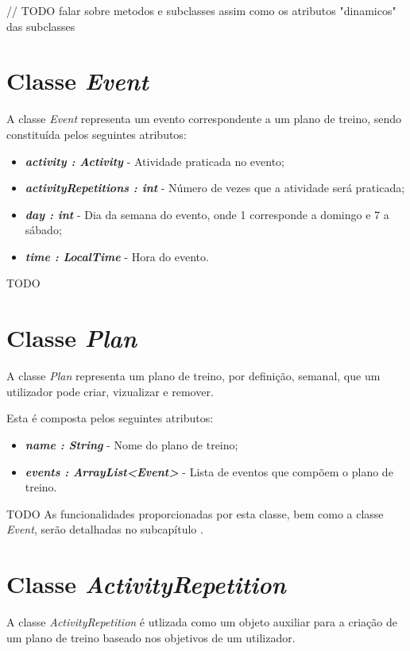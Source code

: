\documentclass[a4paper,12pt]{scrreprt}
\begin{document}
    // TODO falar sobre metodos e subclasses assim como os atributos "dinamicos" das subclasses

\section{Classe \textit{Event}}
    A classe \textit{Event} representa um evento correspondente a um plano de treino, sendo constituída pelos seguintes atributos:

    \begin{itemize}
        \item \textit{\textbf{activity : Activity}} - Atividade praticada no evento;
        \item \textit{\textbf{activityRepetitions : int}} - Número de vezes que a atividade será praticada;
        \item \textit{\textbf{day : int}} - Dia da semana do evento, onde 1 corresponde a domingo e 7 a sábado;
        \item \textit{\textbf{time : LocalTime}} - Hora do evento.
    \end{itemize}

    TODO

\section{Classe \textit{Plan}}
    A classe \textit{Plan} representa um plano de treino, por definição, semanal, que um utilizador pode criar, vizualizar e remover.

    Esta é composta pelos seguintes atributos:
    \begin{itemize}
        \item \textit{\textbf{name : String}} - Nome do plano de treino;
        \item \textit{\textbf{events : ArrayList<Event>}} - Lista de eventos que compõem o plano de treino.
    \end{itemize}

    TODO
    As funcionalidades proporcionadas por esta classe, bem como a classe \textit{Event}, serão detalhadas no subcapítulo \textit{}.

\section{Classe \textit{ActivityRepetition}}
    A classe \textit{ActivityRepetition} é utlizada como um objeto auxiliar para a criação de um plano de treino baseado nos objetivos de um utilizador.
\end{document}
